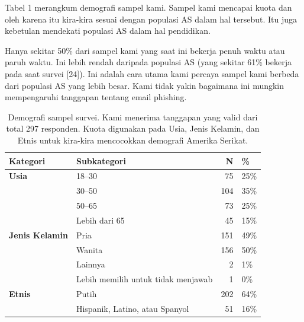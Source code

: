 \documentclass[lettersize,journal]{IEEEtran}
\begin{document}
Tabel 1 merangkum demografi sampel kami. Sampel kami mencapai kuota dan oleh karena itu kira-kira sesuai dengan populasi AS dalam hal tersebut. Itu juga kebetulan mendekati populasi AS dalam hal pendidikan.

Hanya sekitar 50\% dari sampel kami yang saat ini bekerja penuh waktu atau paruh waktu. Ini lebih rendah daripada populasi AS (yang sekitar 61\% bekerja pada saat survei [24]). Ini adalah cara utama kami percaya sampel kami berbeda dari populasi AS yang lebih besar. Kami tidak yakin bagaimana ini mungkin mempengaruhi tanggapan tentang email phishing.

\begin{table}[h!]
  \centering
  \caption{Demografi sampel survei. Kami menerima tanggapan yang valid dari total 297 responden. Kuota digunakan pada Usia, Jenis Kelamin, dan Etnis untuk kira-kira mencocokkan demografi Amerika Serikat.}
  \begin{tabular}{@{}llrl@{}}
    \toprule
    \textbf{Kategori}                      & \textbf{Subkategori}             & \textbf{N} & \textbf{\%} \\ \midrule
    \textbf{Usia}                           & 18--30                           & 75         & 25\%        \\
                                           & 30--50                           & 104        & 35\%        \\
                                           & 50--65                           & 73         & 25\%        \\
                                           & Lebih dari 65                          & 45         & 15\%        \\ \midrule
    \textbf{Jenis Kelamin}                        & Pria                              & 151        & 49\%        \\
                                           & Wanita                            & 156        & 50\%        \\
                                           & Lainnya                            & 2          & 1\%         \\
                                           & Lebih memilih untuk tidak menjawab             & 1          & 0\%         \\ \midrule
    \textbf{Etnis}                     & Putih                            & 202        & 64\%        \\
                                           & Hispanik, Latino, atau Spanyol     & 51         & 16\%        \\

\end{tabular}
\end{table}
\end{document}
